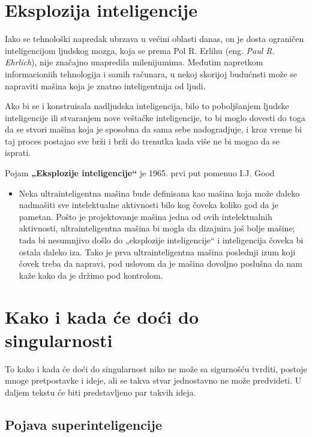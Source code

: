 \documentclass[a4paper]{article}
\begin{document}
\section{Eksplozija inteligencije}
Iako se tehnološki napredak ubrzava u većini oblasti danas, on je dosta ograničen inteligencijom ljudskog mozga, koja se prema Pol R. Erlihu (eng. \textit{Paul R. Ehrlich}), nije značajno unapredila milenijumima.\cite{ref 1} Međutim napretkom informacioniih tehnologija i samih računara, u nekoj skorijoj budućnsti može se napraviti mašina koja je znatno inteligentnija od ljudi.

Ako bi se i konstruisala nadljudska inteligencija, bilo to poboljšanjem ljudske inteligencije ili stvaranjem nove veštačke inteligencije, to bi moglo dovesti do toga da se stvori mašina koja je sposobna da sama sebe nadogradjuje, i kroz vreme bi taj proces postajao sve brži i brži do trenutka kada više ne bi mogao da se isprati.

Pojam \textbf{„Eksplozije inteligencije“} je 1965. prvi put pomenuo I.J. Good\cite{ref 2}

\begin{itemize}
\item Neka ultrainteligentna mašina bude definisana kao mašina koja može daleko nadmašiti sve intelektualne aktivnosti bilo kog čoveka koliko god da je pametan. Pošto je projektovanje mašina jedna od ovih intelektualnih aktivnosti, ultrainteligentna mašina bi mogla da dizajnira još bolje mašine; tada bi nesumnjivo došlo do „eksplozije inteligencije“ i inteligencija čoveka bi ostala daleko iza. Tako je prva ultrainteligentna mašina poslednji izum koji čovek treba da napravi, pod uslovom da je mašina dovoljno poslušna da nam kaže kako da je držimo pod kontrolom.
\end{itemize} 
\section{Kako i kada će doći do singularnosti}	
\label{sec:kakoikada}
To kako i kada će doći do singularnost niko ne može sa sigurnošću tvrditi, postoje mnoge pretpostavke i ideje, ali se takva stvar jednostavno ne može predvideti. U daljem tekstu će biti predstavljeno par takvih ideja.
\subsection{Pojava superinteligencije}
\end{document}
